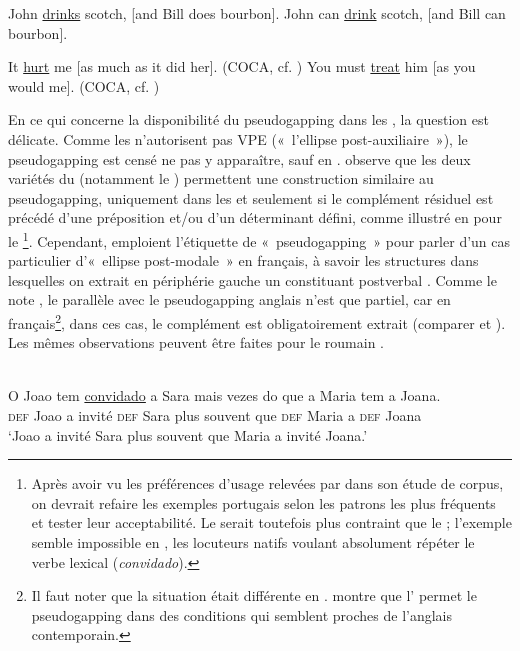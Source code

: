 \ea \label{ch1:ex73}
\ea  John \uline{drinks} scotch, [and Bill does bourbon]. 
\ex  John can \uline{drink} scotch, [and Bill can bourbon].  
\z
\z

\ea \label{ch1:ex74}
\ea  It \uline{hurt} me [as much as it did her]. (COCA, cf. \citealt{Miller2014a}) 
\ex  You must \uline{treat} him [as you would me]. (COCA, cf. \citealt{Miller2014a})  
\z 
\z

En ce qui concerne la disponibilité du pseudogapping dans les , la question est délicate. Comme les  n’autorisent pas VPE («~l’ellipse post-auxiliaire~»), le pseudogapping est censé ne pas y apparaître, sauf en . \citet{Gengel2013} observe que les deux variétés du  (notamment le ) permettent une construction similaire au pseudogapping, uniquement dans les  et seulement si le complément résiduel est précédé d’une préposition et/ou d’un déterminant défini, comme illustré en  pour le \footnote{Après avoir vu les préférences d’usage relevées par \citet{Miller2014a} dans son étude de corpus, on devrait refaire les exemples portugais selon les patrons les plus fréquents et tester leur acceptabilité. Le  serait toutefois plus contraint que le ; l'exemple  semble impossible en , les locuteurs natifs voulant absolument répéter le verbe lexical (\textit{convidado}).}. Cependant, \citet{BusquetsEtAl2001} emploient l’étiquette de «~pseudogapping~» pour parler d’un cas particulier d’«~ellipse post-modale~» en français, à savoir les structures dans lesquelles on extrait en périphérie gauche un constituant postverbal . Comme le note \citet{Dagnac2008}, le parallèle avec le pseudogapping anglais n’est que partiel, car en français\footnote{Il faut noter que la situation était différente en . \citet{Miller1997a} montre que l' permet le pseudogapping dans des conditions qui semblent proches de l'anglais contemporain.}, dans ces cas, le complément est obligatoirement extrait (comparer  et ). Les mêmes observations peuvent être faites pour le roumain .

\ea \label{ch1:ex75}
\\
\gll O  Joao  tem  \uline{convidado}  a  Sara  mais  vezes  {do  que}  a  Maria  tem  a  Joana.\\
  \textsc{def}  Joao  a  invité  \textsc{def}  Sara  plus  souvent  que  \textsc{def}  Maria  a  \textsc{def}  Joana \\
\glt ‘Joao a invité Sara plus souvent que Maria a invité Joana.’ 
\z


